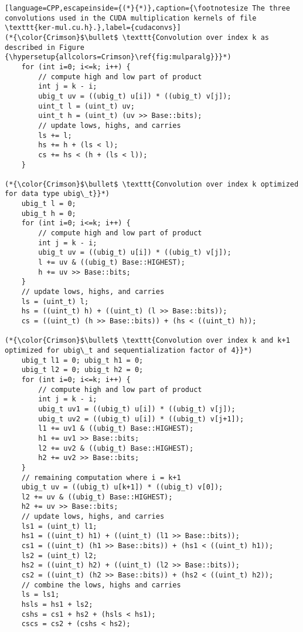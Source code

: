 \begin{lstlisting}[language=CPP,escapeinside={(*}{*)},caption={\footnotesize The three convolutions used in the CUDA multiplication kernels of file \texttt{ker-mul.cu.h}.},label={cudaconvs}]
(*{\color{Crimson}$\bullet$ \texttt{Convolution over index k as described in Figure {\hypersetup{allcolors=Crimson}\ref{fig:mulparalg}}}*)
    for (int i=0; i<=k; i++) {
        // compute high and low part of product
        int j = k - i;
        ubig_t uv = ((ubig_t) u[i]) * ((ubig_t) v[j]);
        uint_t l = (uint_t) uv;
        uint_t h = (uint_t) (uv >> Base::bits);
        // update lows, highs, and carries
        ls += l;
        hs += h + (ls < l);
        cs += hs < (h + (ls < l));
    }

(*{\color{Crimson}$\bullet$ \texttt{Convolution over index k optimized for data type ubig\_t}}*)
    ubig_t l = 0;
    ubig_t h = 0;
    for (int i=0; i<=k; i++) {
        // compute high and low part of product
        int j = k - i;
        ubig_t uv = ((ubig_t) u[i]) * ((ubig_t) v[j]);
        l += uv & ((ubig_t) Base::HIGHEST);
        h += uv >> Base::bits;
    }
    // update lows, highs, and carries
    ls = (uint_t) l;
    hs = ((uint_t) h) + ((uint_t) (l >> Base::bits));
    cs = ((uint_t) (h >> Base::bits)) + (hs < ((uint_t) h));

(*{\color{Crimson}$\bullet$ \texttt{Convolution over index k and k+1 optimized for ubig\_t and sequentialization factor of 4}}*)
    ubig_t l1 = 0; ubig_t h1 = 0;
    ubig_t l2 = 0; ubig_t h2 = 0;
    for (int i=0; i<=k; i++) {
        // compute high and low part of product
        int j = k - i;
        ubig_t uv1 = ((ubig_t) u[i]) * ((ubig_t) v[j]);
        ubig_t uv2 = ((ubig_t) u[i]) * ((ubig_t) v[j+1]);
        l1 += uv1 & ((ubig_t) Base::HIGHEST);
        h1 += uv1 >> Base::bits;
        l2 += uv2 & ((ubig_t) Base::HIGHEST);
        h2 += uv2 >> Base::bits;
    }
    // remaining computation where i = k+1
    ubig_t uv = ((ubig_t) u[k+1]) * ((ubig_t) v[0]);
    l2 += uv & ((ubig_t) Base::HIGHEST);
    h2 += uv >> Base::bits;
    // update lows, highs, and carries
    ls1 = (uint_t) l1;
    hs1 = ((uint_t) h1) + ((uint_t) (l1 >> Base::bits));
    cs1 = ((uint_t) (h1 >> Base::bits)) + (hs1 < ((uint_t) h1));
    ls2 = (uint_t) l2;
    hs2 = ((uint_t) h2) + ((uint_t) (l2 >> Base::bits));
    cs2 = ((uint_t) (h2 >> Base::bits)) + (hs2 < ((uint_t) h2));
    // combine the lows, highs and carries
    ls = ls1;
    hsls = hs1 + ls2;
    cshs = cs1 + hs2 + (hsls < hs1);
    cscs = cs2 + (cshs < hs2);
\end{lstlisting}

